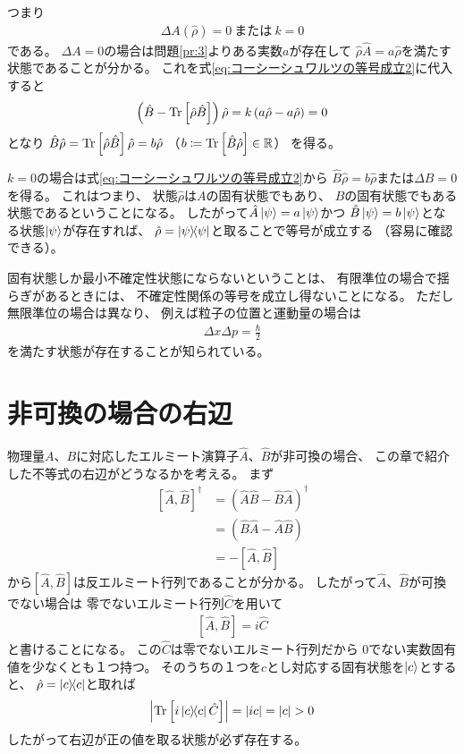 \documentclass[a4paper, 10pt, uplatex]{jsarticle}
\begin{document}
つまり
\begin{align}
	\Delta A \left( \hat{\rho} \right) = 0 \
	\text{または} \
	k = 0
\end{align}
である。
$\Delta A = 0$の場合は問題\ref{pr:3}よりある実数$a$が存在して
$\hat{\rho} \hat{A} = a \hat{\rho}$を満たす状態であることが分かる。
これを式\eqref{eq:コーシーシュワルツの等号成立2}に代入すると
\begin{align}
	\left( \hat{B} - \operatorname*{Tr} \left[ \hat{\rho} \hat{B} \right] \right) \hat{\rho}
	= k \left( a \hat{\rho} - a \hat{\rho} \right)
	= 0
\end{align}
となり
$\hat{B} \hat{\rho} = \operatorname*{Tr} \left[ \hat{\rho} \hat{B} \right] \hat{\rho}
= b \hat{\rho}$
（$b \coloneqq \operatorname*{Tr} \left[ \hat{B} \hat{\rho} \right] \in \mathbb{R}$）
を得る。

$k = 0$の場合は式\eqref{eq:コーシーシュワルツの等号成立2}から
$\hat{B} \hat{\rho} = b \hat{\rho}$または$\Delta B = 0$を得る。
これはつまり、
状態$\hat{\rho}$は$A$の固有状態でもあり、
$B$の固有状態でもある状態であるということになる。
したがって$\hat{A} \Ket{\psi} = a \Ket{\psi}$かつ
$\hat{B} \Ket{\psi} = b \Ket{\psi}$となる状態$\Ket{\psi}$が存在すれば、
$\hat{\rho} = \Ket{\psi} \! \! \Bra{\psi}$と取ることで等号が成立する
（容易に確認できる）。

固有状態しか最小不確定性状態にならないということは、
有限準位の場合で揺らぎがあるときには、
不確定性関係の等号を成立し得ないことになる。
ただし無限準位の場合は異なり、
例えば粒子の位置と運動量の場合は
\begin{align}
	\Delta x \Delta p = \frac{\hbar}{2}
\end{align}
を満たす状態が存在することが知られている。

\section{非可換の場合の右辺}
\label{ap:非可換}
物理量$A$、$B$に対応したエルミート演算子$\hat{A}$、$\hat{B}$が非可換の場合、
この章で紹介した不等式の右辺がどうなるかを考える。
まず
\begin{align}
	\left[ \hat{A}, \hat{B} \right]^\dagger
	&= \left( \hat{A} \hat{B} - \hat{B} \hat{A} \right)^\dagger \\
	&= \left( \hat{B} \hat{A} - \hat{A} \hat{B} \right) \\
	&= -\left[ \hat{A}, \hat{B} \right]
\end{align}
から$\left[ \hat{A}, \hat{B} \right]$は反エルミート行列であることが分かる。
したがって$\hat{A}$、$\hat{B}$が可換でない場合は
零でないエルミート行列$\hat{C}$を用いて
\begin{align}
	\left[ \hat{A}, \hat{B} \right] = i \hat{C}
\end{align}
と書けることになる。
この$\hat{C}$は零でないエルミート行列だから
0でない実数固有値を少なくとも１つ持つ。
そのうちの１つを$c$とし対応する固有状態を$\Ket{c}$とすると、
$\hat{\rho} = \Ket{c} \! \! \Bra{c}$と取れば
\begin{align}
	\left| \operatorname*{Tr} \left[ i \Ket{c} \! \! \Bra{c} \hat{C} \right] \right|
	= \left| i c \right|
	= |c|
	> 0
\end{align}
したがって右辺が正の値を取る状態が必ず存在する。
\end{document}
